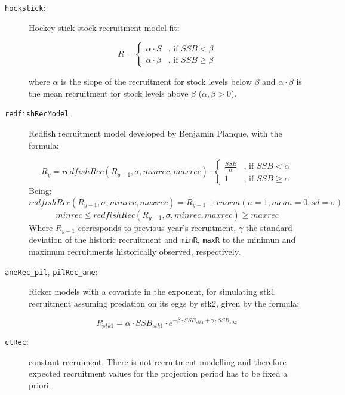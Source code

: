 	\begin{description}

		\item[\texttt{hockstick}:] Hockey stick stock-recruitment model fit:

              \[
 							R = \begin{cases}
   									\alpha\cdot S         & \text{, if } SSB < \beta \\
   									\alpha\cdot \beta     & \text{, if } SSB \geq \beta
  								\end{cases}
							\]

          where $\alpha$ is the slope of the recruitment for stock levels below
          $\beta$ and $\alpha\cdot \beta $ is the mean recruitment for stock levels above
          $\beta$ ($\alpha, \beta > 0$).

		\item[\texttt{redfishRecModel}:] Redfish recruitment model developed by Benjamin Planque, with the formula:

          \[
          R_y = redfishRec(R_{y-1},\sigma, minrec, maxrec) \cdot
            \begin{cases}
              \frac {SSB} \alpha  & \text{, if } SSB < \alpha \\
              1                   & \text{, if } SSB \geq \alpha
            \end{cases}
          \]
          Being:
            $$redfishRec(R_{y-1},\sigma, minrec, maxrec) = R_{y-1} + rnorm(n=1,mean=0,sd=\sigma)$$
            $$minrec \leq redfishRec(R_{y-1},\sigma, minrec, maxrec) \geq maxrec$$
          Where $R_{y-1}$ corresponds to previous year's recruitment, $\gamma$ the standard deviation of
          the historic recruitment and \texttt{minR}, \texttt{maxR}
          to the minimun and maximum recruitments historically observed, respectively.

    \item[\texttt{aneRec_pil}, \texttt{pilRec_ane}:] Ricker models with a covariate in the exponent, for simulating
      stk1 recruitment assuming predation on its eggs by stk2, given by the formula:

        $$R_{stk1} = \alpha\cdot SSB_{stk1} \cdot e^{-\beta \cdot SSB_{stk1} + \gamma \cdot SSB_{stk2}}$$

    \item[\texttt{ctRec}:] constant recruiment. There is not recruitment modelling and therefore expected
        recruitment values for the projection period has to be fixed a priori.

  \end{description}


